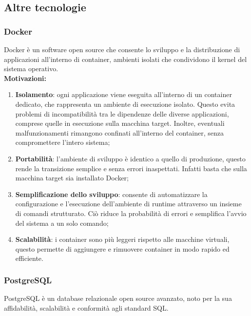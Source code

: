 \subsection{Altre tecnologie}
\label{subsec:altre_tecnologie}

\subsubsection{Docker}
\label{subsubsec:docker}
Docker è un software open source che consente lo sviluppo e la distribuzione di applicazioni all'interno di container, ambienti isolati che condividono il kernel del sistema operativo.\\  

\textbf{Motivazioni:}  
\begin{enumerate}
    \item \textbf{Isolamento}: ogni applicazione viene eseguita all'interno di un container dedicato, che rappresenta un ambiente di esecuzione isolato.  
    Questo evita problemi di incompatibilità tra le dipendenze delle diverse applicazioni, comprese quelle in esecuzione sulla macchina target.  
    Inoltre, eventuali malfunzionamenti rimangono confinati all'interno del container, senza compromettere l'intero sistema;
    \item \textbf{Portabilità}: l'ambiente di sviluppo è identico a quello di produzione, questo rende la transizione semplice e senza errori inaspettati.
    Infatti basta che sulla macchina target sia installato Docker; 
    \item \textbf{Semplificazione dello sviluppo}: consente di automatizzare la configurazione e l'esecuzione dell'ambiente di runtime attraverso un insieme di comandi strutturato.  
    Ciò riduce la probabilità di errori e semplifica l'avvio del sistema a un solo comando;
    \item \textbf{Scalabilità}: i container sono più leggeri rispetto alle macchine virtuali, questo permette di aggiungere e rimuovere container in modo rapido ed efficiente.
\end{enumerate}

\subsubsection{PostgreSQL}
\label{subsubsec:postgresql}
PostgreSQL è un database relazionale open source avanzato, noto per la sua affidabilità, scalabilità e conformità agli standard SQL.\\

